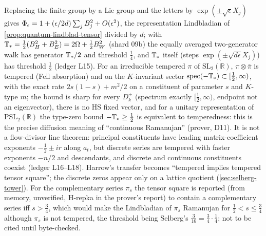 \begin{observation}
\label{obs:continuous-harrow-tempered}
Replacing the finite group by a Lie group and the letters by $\exp(\pm\sqrt\epsilon X_j)$ gives
$\Phi_\epsilon = 1+(\epsilon/2d)\sum_jB_j^2+O(\epsilon^2)$, the representation Lindbladian of
\cref{prop:quantum-lindblad-tensor} divided by $d$; with $\mathbb T_* = \tfrac12(B_H^2+B_E^2) = 2\Omega+
\tfrac12B_W^2$ (shard 09b) the equally averaged two-generator walk has generator $\mathbb T_*/2$ and
threshold $\tfrac14$, and $\mathbb T_*$ itself (steps $\exp(\pm\sqrt{d\epsilon}X_j)$) has threshold
$\tfrac12$ (ledger L15). For an irreducible tempered $\pi$ of $\mathrm{SL}_2(\mathbb R)$,
$\pi\otimes\bar\pi$ is tempered (Fell absorption) and on the $K$-invariant sector
$\operatorname{spec}(-\mathbb T_*)\subset[\tfrac12,\infty)$, with the exact rate $2s(1-s)+m^2/2$ on a
constituent of parameter $s$ and $K$-type $m$; the bound is sharp for every $D_k^\pm$ (spectrum
exactly $[\tfrac12,\infty)$, endpoint not an eigenvector), there is no HS fixed vector, and for a
unitary representation of $\mathrm{PSL}_2(\mathbb R)$ the type-zero bound $-\mathbb T_*\ge\tfrac12$ is
equivalent to temperedness: this is the precise diffusion meaning of ``continuous Ramanujan''
(prover, D11). It is not a flow-divisor line theorem: principal constituents have leading
matrix-coefficient exponents $-\tfrac12\pm ir$ along $a_t$, but discrete series are tempered with
faster exponents $-n/2$ and descendants, and discrete and continuous constituents coexist
(ledger L16--L18). Harrow's transfer becomes ``tempered implies tempered tensor square''; the
discrete zeros appear only on a lattice quotient (\cref{sec:selberg-tower}). For the complementary
series $\pi_s$ the tensor square is reported (from memory, unverified, H-repka in the prover's
report) to contain a complementary series iff $s>\tfrac34$, which would make the Lindbladian of
$\pi_s$ Ramanujan for $\tfrac12<s\le\tfrac34$ although $\pi_s$ is not tempered, the threshold being
Selberg's $\tfrac3{16} = \tfrac34\cdot\tfrac14$; not to be cited until byte-checked.
\end{observation}


